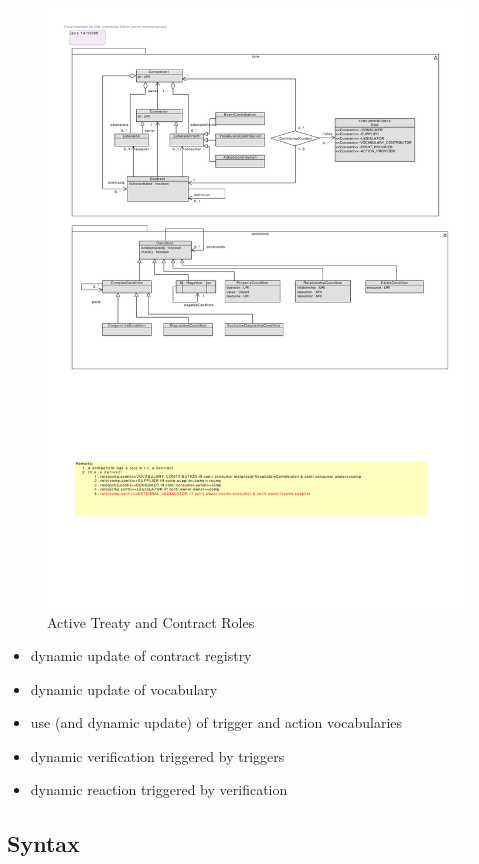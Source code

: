 \documentclass{llncs}
\begin{document}
\begin{figure}[t]
\centering
\includegraphics[width=1.0\textwidth]{RoleModel2.pdf}
\caption{Active Treaty and Contract Roles}
\label{fig2}
\end{figure}

\begin{itemize}
  \item dynamic update of contract registry
  \item dynamic update of vocabulary
  \item use (and dynamic update) of trigger and action vocabularies
  \item dynamic verification triggered by triggers
  \item dynamic reaction triggered by verification
\end{itemize}


\subsection{Syntax}
\end{document}
